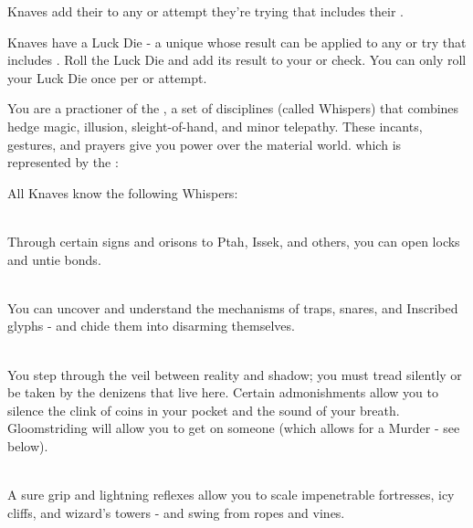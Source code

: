 {  
  Knaves add their \LVL to any \RO or \RB attempt they're trying that includes their \DEX.  

  Knaves have a Luck Die - a unique \UD whose result can be applied to any \RO or \RB try that includes \DEX.  Roll the Luck Die and add its result to your \RO or \RB check.  You can only roll your Luck Die once per \RO or \RB attempt.


  You are a practioner of the , a set of disciplines (called Whispers) that combines hedge magic, illusion, sleight-of-hand, and minor telepathy.  These incants, gestures, and prayers give you power over the material world.  which is represented by the \KNAVE:


  All Knaves know the following Whispers:

   \\
  Through certain signs and orisons to Ptah, Issek, and others, you can open locks and untie bonds.

   \\
  You can uncover and understand the mechanisms of traps, snares, and Inscribed glyphs - and chide them into disarming themselves.

   \\
  You step through the veil between reality and shadow; you must tread silently or be taken by the denizens that live here.  Certain admonishments allow you to silence the clink of coins in your pocket and the sound of your breath.  Gloomstriding will allow you to get  on someone (which allows for a Murder - see below).

   \\
  A sure grip and lightning reflexes allow you to scale impenetrable fortresses, icy cliffs, and wizard's towers - and swing from ropes and vines.

}
